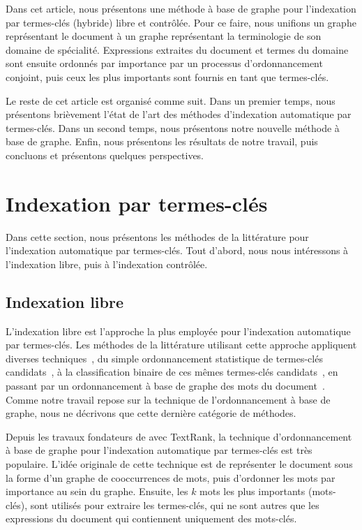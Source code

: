   Dans cet article, nous présentons une méthode à base de graphe pour
  l'indexation par termes-clés (hybride) libre et contrôlée. Pour ce faire, nous
  unifions un graphe représentant le document à un graphe représentant la
  terminologie de son domaine de spécialité. Expressions extraites du document
  et termes du domaine sont ensuite ordonnés par importance par un processus
  d'ordonnancement conjoint, puis ceux les plus importants sont fournis en tant
  que termes-clés.

  Le reste de cet article est organisé comme suit. Dans un premier temps, nous
  présentons brièvement l'état de l'art des méthodes d'indexation automatique
  par termes-clés. Dans un second temps, nous présentons notre nouvelle méthode
  à base de graphe. Enfin, nous présentons les résultats de notre travail, puis
  concluons et présentons quelques perspectives.


\section{Indexation par termes-clés}
\label{sec:main-domain_specific_keyphrase_annotation-state_of_the_art}
  Dans cette section, nous présentons les méthodes de la littérature pour
  l'indexation automatique par termes-clés. Tout d'abord, nous nous intéressons
  à l'indexation libre, puis à l'indexation contrôlée.

  \subsection{Indexation libre}
  \label{subsec:main-domain_specific_keyphrase_annotation-state_of_the_art-keyphrase_extraction}
    L'indexation libre est l'approche la plus employée pour l'indexation
    automatique par termes-clés. Les méthodes de la littérature utilisant cette
    approche appliquent diverses techniques~\cite{hasan2014state_of_the_art}, du
    simple ordonnancement statistique de termes-clés
    candidats~\cite{salton1975tfidf}, à la classification binaire de ces mêmes
    termes-clés candidats~\cite{witten1999kea}, en passant par un ordonnancement
    à base de graphe des mots du document~\cite{mihalcea2004textrank}. Comme
    notre travail repose sur la technique de l'ordonnancement à base de graphe,
    nous ne décrivons que cette dernière catégorie de méthodes.

    Depuis les travaux fondateurs de  avec
    TextRank, la technique d'ordonnancement à base de graphe pour l'indexation
    automatique par termes-clés est très populaire. L'idée originale de cette
    technique est de représenter le document sous la forme d'un graphe de
    cooccurrences de mots, puis d'ordonner les mots par importance au sein du
    graphe. Ensuite, les $k$ mots les plus importants (mots-clés), sont
    utilisés pour extraire les termes-clés, qui ne sont autres que les
    expressions du document qui contiennent uniquement des mots-clés.

